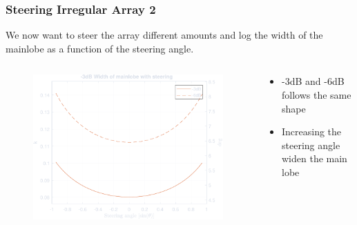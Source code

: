 \documentclass[compress]{beamer}
\begin{document}

\begin{frame} %
    \frametitle{Steering Irregular Array 2}
    We now want to steer the array different amounts and log the width of the
    mainlobe as a function of the steering angle.

    \begin{columns}
        \begin{column}{0.5\textwidth}
            \begin{figure}
                \includegraphics[width=\columnwidth]{"../8.pdf"}
            \end{figure}
        \end{column}
        \begin{column}{0.5\textwidth}
            \begin{itemize}
                \item -3dB and -6dB follows the same shape
                \item Increasing the steering angle widen the main lobe
            \end{itemize}
        \end{column}
    \end{columns}
\end{frame} %
\end{document}
